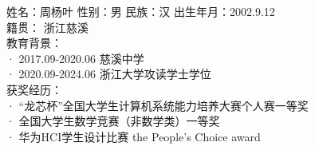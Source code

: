 \cleardoublepage
{}
姓名：周杨叶 \qquad  性别：男  \qquad  民族：汉 \qquad 出生年月：2002.9.12\\
籍贯： 浙江慈溪\\
教育背景：\\
· 2017.09-2020.06 \quad 慈溪中学\\
· 2020.09-2024.06 \quad 浙江大学攻读学士学位\\
获奖经历：\\
· “龙芯杯”全国大学生计算机系统能力培养大赛个人赛一等奖\\
· 全国大学生数学竞赛（非数学类）一等奖\\
· 华为HCI学生设计比赛 the People's Choice award\\
